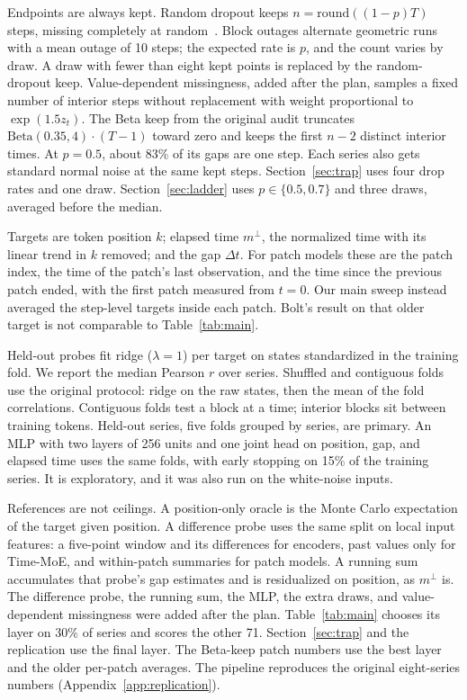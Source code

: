 \documentclass{article}
\newcommand{\mperp}{m^{\perp}}
\newcommand{\dt}{\Delta t}
\begin{document}
Endpoints are always kept.
Random dropout keeps $n = \mathrm{round}((1-p)T)$ steps, missing completely at random~\citep{little2019missing}.
Block outages alternate geometric runs with a mean outage of 10 steps; the expected rate is $p$, and the count varies by draw.
A draw with fewer than eight kept points is replaced by the random-dropout keep.
Value-dependent missingness, added after the plan, samples a fixed number of interior steps without replacement with weight proportional to $\exp(1.5 z_t)$.
The Beta keep from the original audit truncates $\mathrm{Beta}(0.35,4)\cdot(T-1)$ toward zero and keeps the first $n-2$ distinct interior times.
At $p = 0.5$, about 83\% of its gaps are one step.
Each series also gets standard normal noise at the same kept steps.
Section~\ref{sec:trap} uses four drop rates and one draw.
Section~\ref{sec:ladder} uses $p \in \{0.5, 0.7\}$ and three draws, averaged before the median.

Targets are token position $k$; elapsed time $\mperp$, the normalized time with its linear trend in $k$ removed; and the gap $\dt$.
For patch models these are the patch index, the time of the patch's last observation, and the time since the previous patch ended, with the first patch measured from $t = 0$.
Our main sweep instead averaged the step-level targets inside each patch.
Bolt's result on that older target is not comparable to Table~\ref{tab:main}.

Held-out probes fit ridge ($\lambda = 1$) per target on states standardized in the training fold.
We report the median Pearson $r$ over series.
Shuffled and contiguous folds use the original protocol: ridge on the raw states, then the mean of the fold correlations.
Contiguous folds test a block at a time; interior blocks sit between training tokens.
Held-out series, five folds grouped by series, are primary.
An MLP with two layers of 256 units and one joint head on position, gap, and elapsed time uses the same folds, with early stopping on 15\% of the training series.
It is exploratory, and it was also run on the white-noise inputs.

References are not ceilings.
A position-only oracle is the Monte Carlo expectation of the target given position.
A difference probe uses the same split on local input features: a five-point window and its differences for encoders, past values only for Time-MoE, and within-patch summaries for patch models.
A running sum accumulates that probe's gap estimates and is residualized on position, as $\mperp$ is.
The difference probe, the running sum, the MLP, the extra draws, and value-dependent missingness were added after the plan.
Table~\ref{tab:main} chooses its layer on 30\% of series and scores the other 71.
Section~\ref{sec:trap} and the replication use the final layer.
The Beta-keep patch numbers use the best layer and the older per-patch averages.
The pipeline reproduces the original eight-series numbers (Appendix~\ref{app:replication}).
\end{document}
